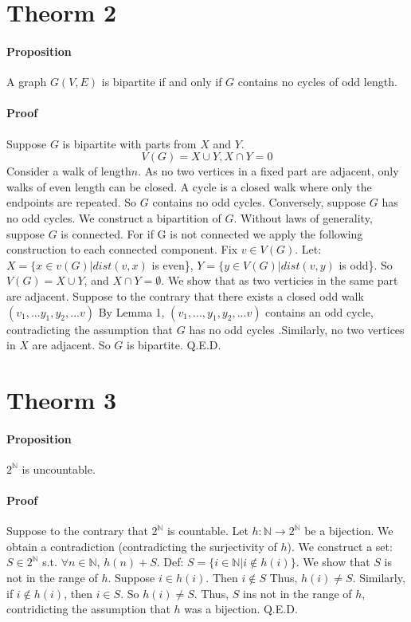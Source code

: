 \documentclass{article}
\begin{document}
\section{Theorm 2}
\paragraph{Proposition}A graph $G(V, E)$ is bipartite if and only if $G$ contains no cycles of odd length.
\paragraph{Proof}Suppose $G$ is bipartite with parts from $X$ and $Y$. $$V(G)=X\cup Y, X\cap Y=0$$ Consider a walk of length$n$. As no two vertices in a fixed part are adjacent, only walks of even length can be closed. A cycle is a closed walk where only the endpoints are repeated. So $G$ contains no odd cycles. Conversely, suppose $G$ has no odd cycles. We construct a bipartition of $G$. Without laws of generality, suppose $G$ is connected. For if G is not connected we apply the following construction to each connected component. Fix $v \in V(G)$. Let: $X = \{x\in v(G)|dist(v,x)$ is even\}, $Y = \{y \in V(G)|dist(v,y)$ is odd\}. So $V(G)=X \cup Y$, and $X \cap Y= \emptyset$. We show that as two verticies in the same part are adjacent. Suppose to the contrary that there exists a closed odd walk $(v_1,...y_1,y_2,...v)$ By Lemma 1, $(v _1,...,y_1,y_2,...v)$ contains an odd cycle, contradicting the assumption that $G$ has no odd cycles .Similarly, no two vertices in $X$ are adjacent. So $G$ is bipartite. Q.E.D.

\section{Theorm 3}
\paragraph{Proposition} $2^\mathbb{N}$ is uncountable.
\paragraph{Proof} Suppose to the contrary that $2^\mathbb{N}$ is countable. Let $h: \mathbb{N} \rightarrow 2^\mathbb{N}$ be a bijection. We obtain a contradiction (contradicting the surjectivity of $h$). We construct a set: $S \in 2^\mathbb{N}$ s.t. $\forall n\in \mathbb{N}$, $h(n)+S$. Def: $S=\{i \in \mathbb{N} | i \notin h(i)\}$. We show that $S$ is not in the range of $h$. Suppose $i \in h(i)$. Then $i\notin S$ Thus, $h(i)\neq S$. Similarly, if $i \notin h(i)$, then $i\in S$. So $h(i)\neq S$. Thus, $S$ ins not in the range of $h$, contridicting the assumption that $h$ was a bijection. Q.E.D.
\end{document}
